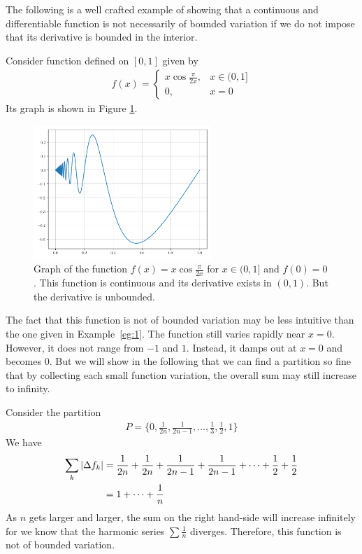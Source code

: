\documentclass[thmcnt=section, color=blue, 12pt]{my-elegantbook}
\begin{document}
The following is a well crafted example of showing that
a continuous and differentiable function is not necessarily
of bounded variation
if we do not impose that its derivative is bounded in the interior.

\begin{example}
	Consider function defined on $[0, 1]$ given by
	\begin{align*}
		f(x) = \begin{cases}
			       x \cos \frac{\pi}{2x}, & x \in (0, 1] \\
			       0,                     & x = 0
		       \end{cases}
	\end{align*}
	Its graph is shown in Figure \ref{fig:2}.

	\begin{figure}[H]
		\centering
		\includegraphics[width=0.6\textwidth]{figures/continuous-function-that-is-not-of-bounded-variation.png}
		\caption{Graph of the function $f(x) = x \cos \frac{\pi}{2x}$ for $x \in (0, 1]$ and $f(0) = 0$. This function is continuous and its derivative exists in $(0, 1)$. But the derivative is unbounded.}
		\label{fig:2}
	\end{figure}

	The fact that this function is not of bounded variation may be less intuitive
	than the one given in Example~\ref{eg:1}.
	The function still varies rapidly near $x=0$.
	However, it does not range from $-1$ and $1$.
	Instead, it damps out at $x=0$ and becomes $0$.
	But we will show in the following that we can find a partition so fine that
	by collecting each small function variation,
	the overall sum may still increase to infinity.

	Consider the partition
	\begin{align*}
		P = \{0, \frac{1}{2n}, \frac{1}{2n - 1}, \dots, \frac{1}{3}, \frac{1}{2}, 1\}
	\end{align*}
	We have
	\begin{align*}
		\sum_k \left\lvert \Delta f_k \right\rvert
		 & = \frac{1}{2n} + \frac{1}{2n} + \frac{1}{2n - 1} + \frac{1}{2n - 1}
		+ \dots + \frac{1}{2} + \frac{1}{2}                                    \\
		 & = 1 + \cdots + \frac{1}{n}
	\end{align*}
	As $n$ gets larger and larger,
	the sum on the right hand-side will increase infinitely
	for we know that the harmonic series $\sum \frac{1}{n}$ diverges.
	Therefore, this function is not of bounded variation.
\end{example}
\end{document}
